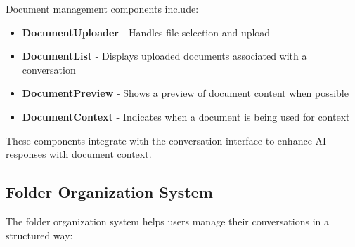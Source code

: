 Document management components include:

\begin{itemize}
  \item \textbf{DocumentUploader} - Handles file selection and upload
  \item \textbf{DocumentList} - Displays uploaded documents associated with a conversation
  \item \textbf{DocumentPreview} - Shows a preview of document content when possible
  \item \textbf{DocumentContext} - Indicates when a document is being used for context
\end{itemize}

These components integrate with the conversation interface to enhance AI responses with document context.

\subsection{Folder Organization System}

The folder organization system helps users manage their conversations in a structured way:

